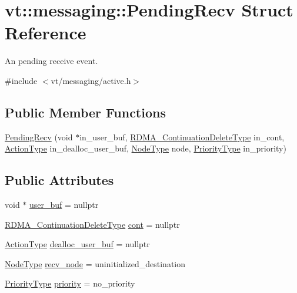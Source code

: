 \hypertarget{structvt_1_1messaging_1_1_pending_recv}{}\section{vt\+:\+:messaging\+:\+:Pending\+Recv Struct Reference}
\label{structvt_1_1messaging_1_1_pending_recv}


An pending receive event.  




{\ttfamily \#include $<$vt/messaging/active.\+h$>$}

\subsection*{Public Member Functions}
\begin{DoxyCompactItemize}
\item 
\hyperlink{structvt_1_1messaging_1_1_pending_recv_a8b8d3d9bc971616b5768bf5f643c0fcb}{Pending\+Recv} (void $\ast$in\+\_\+user\+\_\+buf, \hyperlink{namespacevt_a4dfad0b5809d9812d60a0311a45ae0c2}{R\+D\+M\+A\+\_\+\+Continuation\+Delete\+Type} in\+\_\+cont, \hyperlink{namespacevt_ae0a5a7b18cc99d7b732cb4d44f46b0f3}{Action\+Type} in\+\_\+dealloc\+\_\+user\+\_\+buf, \hyperlink{namespacevt_a866da9d0efc19c0a1ce79e9e492f47e2}{Node\+Type} node, \hyperlink{namespacevt_a86bff9f556eb761b27fc8600d006ac04}{Priority\+Type} in\+\_\+priority)
\end{DoxyCompactItemize}
\subsection*{Public Attributes}
\begin{DoxyCompactItemize}
\item 
void $\ast$ \hyperlink{structvt_1_1messaging_1_1_pending_recv_a18d11f650583c3da5a7362e0c998be5d}{user\+\_\+buf} = nullptr
\item 
\hyperlink{namespacevt_a4dfad0b5809d9812d60a0311a45ae0c2}{R\+D\+M\+A\+\_\+\+Continuation\+Delete\+Type} \hyperlink{structvt_1_1messaging_1_1_pending_recv_a563f27a8d702e5d8f29728d08a154558}{cont} = nullptr
\item 
\hyperlink{namespacevt_ae0a5a7b18cc99d7b732cb4d44f46b0f3}{Action\+Type} \hyperlink{structvt_1_1messaging_1_1_pending_recv_a1d0de0586d485b2b6af7daacafa7ea0d}{dealloc\+\_\+user\+\_\+buf} = nullptr
\item 
\hyperlink{namespacevt_a866da9d0efc19c0a1ce79e9e492f47e2}{Node\+Type} \hyperlink{structvt_1_1messaging_1_1_pending_recv_a825e26d40a2ef02a105fc2309da4a108}{recv\+\_\+node} = uninitialized\+\_\+destination
\item 
\hyperlink{namespacevt_a86bff9f556eb761b27fc8600d006ac04}{Priority\+Type} \hyperlink{structvt_1_1messaging_1_1_pending_recv_ac532592ff86b902de3c38c971db6290e}{priority} = no\+\_\+priority
\end{DoxyCompactItemize}


